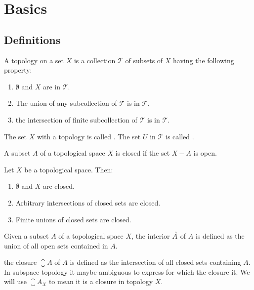 \chapter{Basics}

\section{Definitions}

\begin{definition}
    A topology on a set $X$ is a collection $\mathcal{T}$ of subsets of $X$ having the following property:
    \begin{enumerate}
        \item $\emptyset$ and $X$ are in $\mathcal{T}$.
        \item The union of any subcollection of $\mathcal{T}$ is in $\mathcal{T}$.
        \item the intersection of finite subcollection of $\mathcal{T}$ is in $\mathcal{T}$.
    \end{enumerate}

The set $X$ with a topology is called . The set $U$ in $\mathcal{T}$ is called .
\end{definition}

\begin{definition}
    A subset $A$ of a topological space $X$ is closed if the set $X - A$ is open.
\end{definition}

\begin{definition}
    Let $X$ be a topological space. Then:
    \begin{enumerate}
        \item $\emptyset$ and $X$ are closed.
        \item Arbitrary intersections of closed sets are closed.
        \item Finite unions of closed sets are closed.
    \end{enumerate}
\end{definition}


\begin{definition}
    Given a subset $A$ of a topological space $X$, the interior $\mathring{A}$ of $A$ is defined as the union of all open sets contained in $A$.
\end{definition}

\begin{definition}
    the closure $\closure{A}$ of $A$ is defined as the intersection of all closed sets containing $A$. In subspace topology it maybe ambiguous to express for which the closure it. We will use $\closure{A}_X$ to mean it is a closure in topology $X$.
\end{definition}

